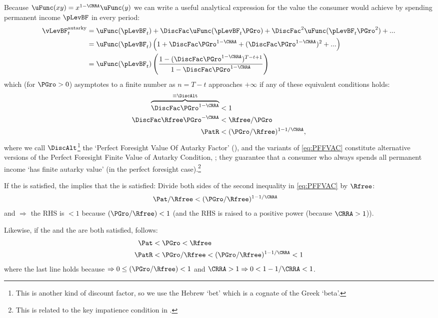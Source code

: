 \documentclass[BufferStockTheory]{subfiles}
\begin{document}
Because $\uFunc(xy) = x^{1-\CRRA}\uFunc(y)$ we can write a useful analytical expression for the value the consumer would achieve by spending permanent income $\pLevBF$ in every period:
\begin{align}
  \vLevBF_{t}^{\text{autarky}}  & = \uFunc(\pLevBF_{t})+\DiscFac \uFunc(\pLevBF_{t}\PGro)+\DiscFac^{2} \uFunc(\pLevBF_{t} \PGro^{2})+... \label{eq:ValuePFAnalyticalAutarky}
  \\  & = \uFunc(\pLevBF_{t})\left(1+\DiscFac \PGro^{1-\CRRA}+(\DiscFac \PGro^{1-\CRRA})^{2}+...\right) \notag 
  \\  & = \uFunc(\pLevBF_{t})\left(\frac{1-(\DiscFac \PGro^{1-\CRRA})^{T-t+1}}{1-\DiscFac \PGro^{1-\CRRA}}\right) \notag
\end{align}
which (for $\PGro>0$) asymptotes to a finite number as $n=T-t$ approaches $+\infty$ if any of these equivalent conditions holds:
\begin{align}
  \overbrace{\DiscFac \PGro^{1-\CRRA} }^{\equiv \DiscAlt}  & < 1  \nonumber 
  \\ \DiscFac \Rfree \PGro^{-\CRRA}  & < \Rfree/\PGro \label{eq:PFFVAC} 
  \\ \PatR    & < (\PGro/\Rfree)^{1-1/\CRRA},  \nonumber
\end{align}
where we call $\DiscAlt$\footnote{This is another kind of discount factor, so we use the Hebrew `bet' which is a cognate of the Greek `beta'.} the `Perfect Foresight Value Of Autarky Factor' ({\PFVAF}), and the variants of \eqref{eq:PFFVAC} constitute alternative versions of the Perfect Foresight Finite Value of Autarky Condition, \PFFVAC; they guarantee that a consumer who always spends all permanent income `has finite autarky value'  (in the perfect foresight case).\footnote{This is related to the key impatience condition in \cite{asHomogeneous}.}

If the {\FHWC} is satisfied, the {\PFFVAC} implies that the {\RIC} is satisfied: Divide both sides of the second inequality in \eqref{eq:PFFVAC} by $\Rfree$:
\begin{align}
   \Pat/\Rfree & < (\PGro/\Rfree)^{1-1/\CRRA}  \label{eq:FHWCandPFFVACimplyRIC}
\end{align}
and {\FHWC} $\Rightarrow$ the RHS is $< 1$ because $(\PGro/\Rfree) < 1$ (and the RHS is raised to a positive power (because $\CRRA>1$)).

Likewise, if the {\FHWC} and the {\GIC} are both satisfied, {\PFFVAC} follows:
\begin{align}
 \Pat & < \PGro < \Rfree \notag
\\   \PatR & < \PGro/\Rfree < (\PGro/\Rfree)^{1-1/\CRRA} < 1\label{eq:GICandFHWCimplyPFFVAC}
\end{align}
where the last line holds because {\FHWC} $\Rightarrow 0 \leq (\PGro/\Rfree) < 1$ and $\CRRA > 1 \Rightarrow 0 < 1-1/\CRRA < 1$.
\end{document}
